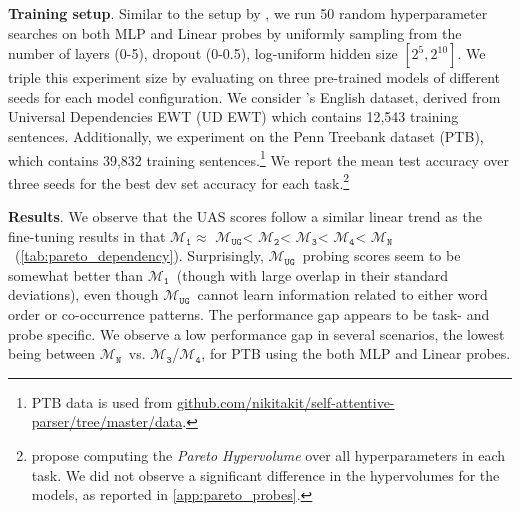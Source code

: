 \documentclass[letterpaper, 12pt]{report}
\newcommand{\xhdr}[1]{{\noindent\bfseries #1}.}
\newcommand{\OR}{$\mathcal{M}_{\texttt{N}}$}
\newcommand{\RI}{$\mathcal{M}_{\texttt{1}}$}
\newcommand{\RII}{$\mathcal{M}_{\texttt{2}}$}
\newcommand{\RIII}{$\mathcal{M}_{\texttt{3}}$}
\newcommand{\RIV}{$\mathcal{M}_{\texttt{4}}$}
\newcommand{\RC}{$\mathcal{M}_{\texttt{UG}}$}
\begin{document}
\xhdr{Training setup} Similar to the setup by \citet{pimentel-etal-2020-pareto}, we run 50 random hyperparameter searches on both MLP and Linear probes by uniformly sampling from the number of layers (0-5), dropout (0-0.5), log-uniform hidden size $[2^{5}, 2^{10}]$. We triple this experiment size by evaluating on three pre-trained models of different seeds for each model configuration.
We consider \citeauthor{pimentel-etal-2020-pareto}'s English dataset, derived from Universal Dependencies EWT (UD EWT) \cite{bies2012english, silveira2014gold} which contains 12,543 training sentences.
Additionally, we experiment on the Penn Treebank dataset (PTB), which contains 39,832 training sentences.\footnote{PTB data \citep{kitaev-etal-2019-multilingual} is used from \href{https://github.com/nikitakit/self-attentive-parser/tree/master/data}{github.com/nikitakit/self-attentive-parser/tree/master/data}.}
We report the mean test accuracy over three seeds for the best dev set accuracy for each task.\footnote{\citet{pimentel-etal-2020-pareto} propose computing the \textit{Pareto Hypervolume} over all hyperparameters in each task. We did not observe a significant difference in the hypervolumes for the models, as reported in \autoref{app:pareto_probes}.}





\xhdr{Results} We observe that
the UAS scores follow a similar linear trend as the fine-tuning results in that \RI $\approx$ \RC < \RII < \RIII < \RIV < \OR\ (\autoref{tab:pareto_dependency}).
Surprisingly, \RC\ probing scores seem to be somewhat better than \RI\ (though with large overlap in their standard deviations), even though \RC\ cannot learn information related to either word order or co-occurrence patterns.
The performance gap appears to be task- and probe specific.
We observe a low performance gap in several scenarios, the lowest being between \OR\ vs. \RIII/\RIV, for PTB using the both MLP and Linear probes.
\end{document}
